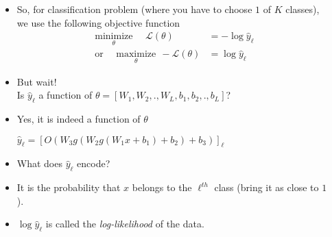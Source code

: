 \begin{frame}
  \begin{columns}
    \begin{overlayarea}{\textwidth}{\textheight}
      \vspace{0.3cm}
      \makebox[\textwidth][c]{\usebox{\nncontent}}
    \end{overlayarea}

    \begin{overlayarea}{\textwidth}{\textheight}
      \begin{itemize}[<+->]
      \justifying
        \item So, for classification problem (where you have to choose $1$ of $K$ classes), we use the following objective function
          \begin{align*}
                        \underset{\theta}{\text{minimize}} ~~~~~~\mathscr{L}(\theta) &= -\log \hat{y}_{\ell} \\ %
              \text{or}~~~~~~\underset{\theta}{\text{maximize}} ~~ -\mathscr{L}(\theta) &=  \log \hat{y}_{\ell}    %
          \end{align*}
        \item But wait! \\
            Is $\hat{y}_\ell$ a function of $\theta=[W_1,W_2,.,W_L,b_1,b_2,.,b_L]$?
        \item Yes, it is indeed a function of $\theta$
          \begin{center}
            $ \hat y_\ell = [O(W_{3}g(W_{2}g(W_{1}x+b_{1})+b_{2})+b_{3})]_\ell $
          \end{center}
        \item What does $\hat{y}_\ell$ encode? 
        \item It is the probability that $x$ belongs to the $\ell^{th}$ class (bring it as close to $1$).
        \item $\log \hat{y}_\ell$ is called the \textit{log-likelihood} of the data.
      \end{itemize}
    \end{overlayarea}
  \end{columns}
\end{frame}

